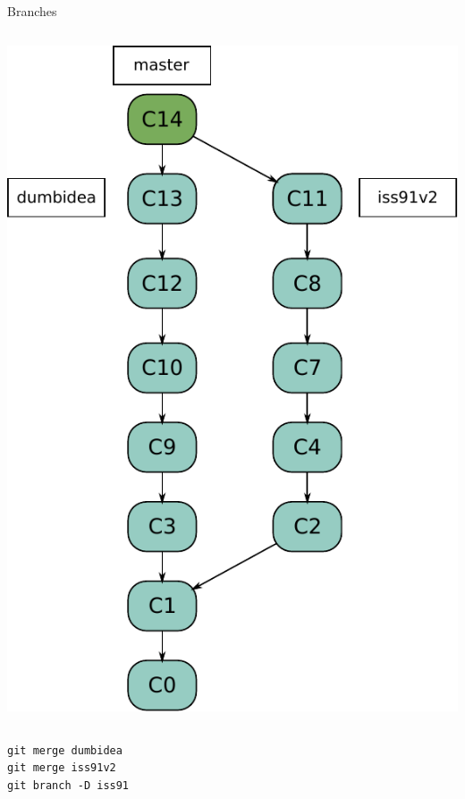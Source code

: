 \begin{frame}{Branches}
\begin{columns}[T]
\begin{column}{.45\textwidth}
\begin{block}{}
        \pause \includegraphics[scale=0.4]{images/feature-branches2.pdf}
    \end{block}
  \end{column}
\end{columns}  
\begin{tiny}
\pause \texttt{git merge dumbidea} \\
\pause \texttt{git merge iss91v2} \\
\pause \texttt{git branch -D iss91} \\
\end{tiny}
\end{frame}


